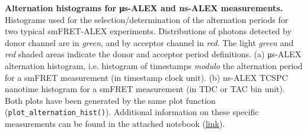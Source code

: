 \label{fig:altern_hist_double} 
\textbf{Alternation histograms for μs-ALEX and ns-ALEX measurements.}
Histograms used for the selection/determination
of the alternation periods for two typical smFRET-ALEX experiments.
Distributions of photons detected by donor channel are in \textit{green}, 
and by acceptor channel in \textit{red}.
The light \textit{green} and \textit{red} shaded areas indicate the donor 
and acceptor period definitions.
(a) μs-ALEX alternation histogram, i.e. histogram of timestamps \textit{modulo} 
the alternation period for a smFRET measurement (in timestamp clock unit). 
(b) ns-ALEX TCSPC nanotime histogram for a smFRET measurement (in TDC or TAC bin unit).
Both plots have been generated by the same plot function 
(\texttt{plot\_alternation\_hist()}).
Additional information on these specific measurements can be found in the 
attached notebook
(\href{http://nbviewer.jupyter.org/github/tritemio/fretbursts_paper/blob/master/notebooks/Figures\%20-\%20ALEX\%20histograms.ipynb}{link}).
